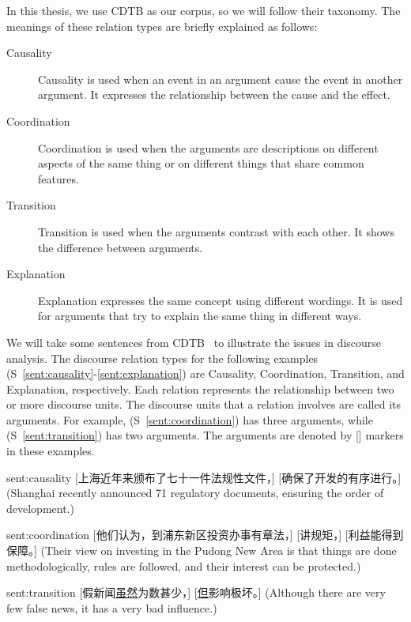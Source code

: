 In this thesis, we use CDTB as our corpus, so we will follow their taxonomy.
The meanings of these relation types are briefly explained as follows:

\begin{description}
\item[Causality] Causality is used when an event in an argument cause the event
    in another argument. It expresses the relationship between the cause
    and the effect.
\item[Coordination] Coordination is used when the arguments are
    descriptions on different aspects of the same thing or
    on different things that share common features.
\item[Transition] Transition is used when the arguments contrast with each other.
    It shows the difference between arguments.
\item[Explanation] Explanation expresses the same concept using different wordings.
    It is used for arguments that try to explain the same thing in different
    ways.
\end{description}


We will take some sentences from CDTB~\citep{li2014building} to illustrate the issues
in discourse analysis. The discourse relation types for the following examples
(S~\ref{sent:causality}-\ref{sent:explanation}) are
Causality, Coordination, Transition, and Explanation, respectively.
Each relation represents the relationship between two or more discourse units.
The discourse units that a relation involves are called its arguments.
For example, (S~\ref{sent:coordination}) has
three arguments, while (S~\ref{sent:transition}) has two arguments. The arguments are
denoted by [] markers in these examples.

\begin{sent}{sent:causality}{}
    [上海近年来颁布了七十一件法规性文件，] [确保了开发的有序进行。]
    (Shanghai recently announced 71 regulatory documents, ensuring
    the order of development.)
\end{sent}

\begin{sent}{sent:coordination}{}
    [他们认为，到浦东新区投资办事有章法，] [讲规矩，] [利益能得到保障。]
    (Their view on investing in the Pudong New Area is that
    things are done methodologically,
    rules are followed, and their interest can be protected.)
\end{sent}

\begin{sent}{sent:transition}{}
    [假新闻\underline{虽然}为数甚少，] [\underline{但}影响极坏。]
    (Although there are very few false news, it has a very bad influence.)
\end{sent}

